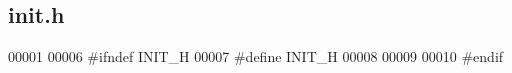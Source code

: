 \hypertarget{init_8h_source}{}\subsection{init.\+h}
\label{init_8h_source}

\begin{DoxyCode}
00001 
00006 \textcolor{preprocessor}{#ifndef INIT\_H}
00007 \textcolor{preprocessor}{#define INIT\_H}
00008 
00009 
00010 \textcolor{preprocessor}{#endif}
\end{DoxyCode}
